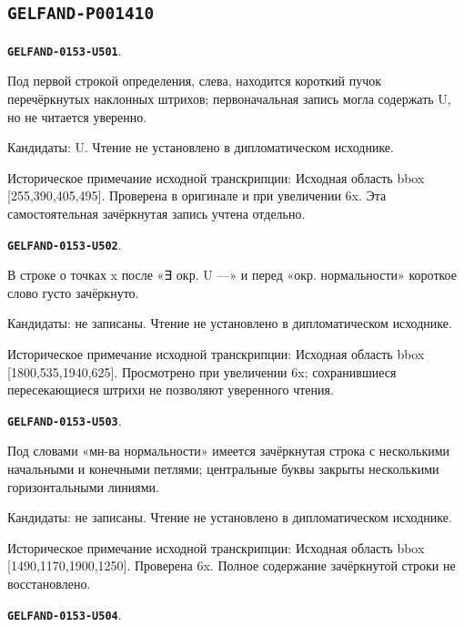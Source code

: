 \documentclass[11pt]{article}
\theoremstyle{definition}
\theoremstyle{remark}
\begin{document}
\subsection*{\texttt{GELFAND-P001410}}
\par\noindent\leavevmode{}\label{GELFAND-0153-U501}\label{GELFAND-P001410:isolated-cancellation:note}\textbf{\texttt{GELFAND-0153-U501}}.\nopagebreak[4]\par
Под первой строкой определения, слева, находится короткий пучок перечёркнутых наклонных штрихов; первоначальная запись могла содержать U, но не читается уверенно.\par
Кандидаты: U. Чтение не установлено в дипломатическом исходнике.\par
Историческое примечание исходной транскрипции: Исходная область bbox [255,390,405,495]. Проверена в оригинале и при увеличении 6x. Эта самостоятельная зачёркнутая запись учтена отдельно.\par\medskip
\par\noindent\leavevmode{}\label{GELFAND-0153-U502}\label{GELFAND-P001410:normality-cancellation:note}\textbf{\texttt{GELFAND-0153-U502}}.\nopagebreak[4]\par
В строке о точках x после «∃ окр. U —» и перед «окр. нормальности» короткое слово густо зачёркнуто.\par
Кандидаты: не записаны. Чтение не установлено в дипломатическом исходнике.\par
Историческое примечание исходной транскрипции: Исходная область bbox [1800,535,1940,625]. Просмотрено при увеличении 6x; сохранившиеся пересекающиеся штрихи не позволяют уверенного чтения.\par\medskip
\par\noindent\leavevmode{}\label{GELFAND-0153-U503}\label{GELFAND-P001410:components-cancellation:note}\textbf{\texttt{GELFAND-0153-U503}}.\nopagebreak[4]\par
Под словами «мн-ва нормальности» имеется зачёркнутая строка с несколькими начальными и конечными петлями; центральные буквы закрыты несколькими горизонтальными линиями.\par
Кандидаты: не записаны. Чтение не установлено в дипломатическом исходнике.\par
Историческое примечание исходной транскрипции: Исходная область bbox [1490,1170,1900,1250]. Проверена 6x. Полное содержание зачёркнутой строки не восстановлено.\par\medskip
\par\noindent\leavevmode{}\label{GELFAND-0153-U504}\label{GELFAND-P001410:sullivan-cancellation:note}\textbf{\texttt{GELFAND-0153-U504}}.\nopagebreak[4]\par
\end{document}
